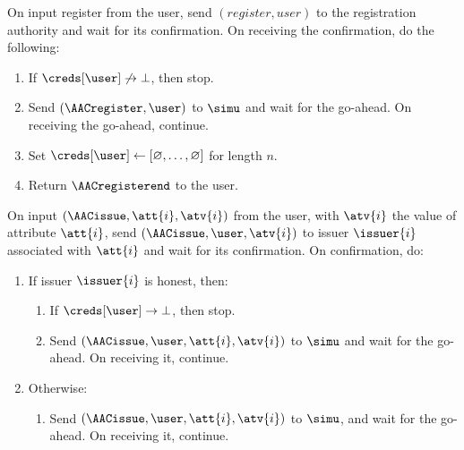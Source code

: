 \begingroup
    \begin{framed}


	\fuinterface{\AACregister} On input register from the user, send $(register,
user)$ to the registration authority and wait for its confirmation.  On
receiving the confirmation, do the following:

	\begin{enumerate}

	  \item If $\creds[\user] \not\rightarrow \bot$, then stop.

	  \item Send $(\AACregister, \user)$ to $\simu$ and wait for the
go-ahead. On receiving the go-ahead, continue.

	  \item Set $\creds[\user] \leftarrow [\varnothing, \ldots,
\varnothing]$ for length $n$.

	  \item Return $\AACregisterend$ to the user.

	\end{enumerate}

	\fuinterface{\AACissue} On input $(\AACissue, \att{i},\atv{i})$ from the user,
with $\atv{i}$ the value of attribute $\att{i}$, send $(\AACissue, \user,
\atv{i})$ to issuer $\issuer{i}$ associated with $\att{i}$ and wait for its
confirmation.  On confirmation, do:

	\begin{enumerate}

	  \item If issuer $\issuer{i}$ is honest, then:

	    \begin{enumerate}

	      \item If $\creds[\user] \rightarrow \bot$, then stop.

	      \item Send $(\AACissue, \user, \att{i}, \atv{i})$ to $\simu$ and
wait for the go-ahead. On receiving it, continue.

	    \end{enumerate}

	  \item Otherwise:

	    \begin{enumerate}

	      \item Send $(\AACissue, \user, \att{i}, \atv{i})$ to $\simu$, and
wait for the go-ahead. On receiving it, continue.


\end{enumerate}
\end{enumerate}
\end{framed}
